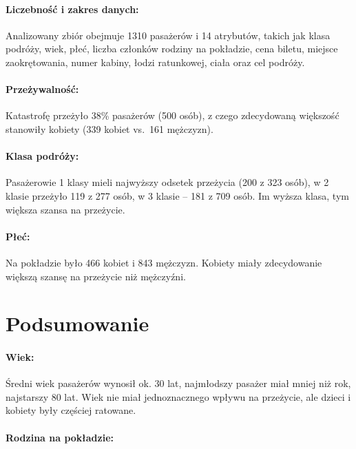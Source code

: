 \documentclass[11pt]{article}
\begin{document}
\paragraph{Liczebność i zakres
danych:}\label{liczebnoux15bux107-i-zakres-danych}

Analizowany zbiór obejmuje 1310 pasażerów i 14 atrybutów, takich jak
klasa podróży, wiek, płeć, liczba członków rodziny na pokładzie, cena
biletu, miejsce zaokrętowania, numer kabiny, łodzi ratunkowej, ciała
oraz cel podróży.

\paragraph{Przeżywalność:}\label{przeux17cywalnoux15bux107}

Katastrofę przeżyło 38\% pasażerów (500 osób), z czego zdecydowaną
większość stanowiły kobiety (339 kobiet vs.~161 mężczyzn).

\paragraph{Klasa podróży:}\label{klasa-podruxf3ux17cy}

Pasażerowie 1 klasy mieli najwyższy odsetek przeżycia (200 z 323 osób),
w 2 klasie przeżyło 119 z 277 osób, w 3 klasie -- 181 z 709 osób. Im
wyższa klasa, tym większa szansa na przeżycie.

\paragraph{Płeć:}\label{pux142eux107}

Na pokładzie było 466 kobiet i 843 mężczyzn. Kobiety miały zdecydowanie
większą szansę na przeżycie niż mężczyźni.

    \section{Podsumowanie}\label{podsumowanie}

\paragraph{Wiek:}\label{wiek}

Średni wiek pasażerów wynosił ok. 30 lat, najmłodszy pasażer miał mniej
niż rok, najstarszy 80 lat. Wiek nie miał jednoznacznego wpływu na
przeżycie, ale dzieci i kobiety były częściej ratowane.

\paragraph{Rodzina na pokładzie:}\label{rodzina-na-pokux142adzie}
\end{document}
